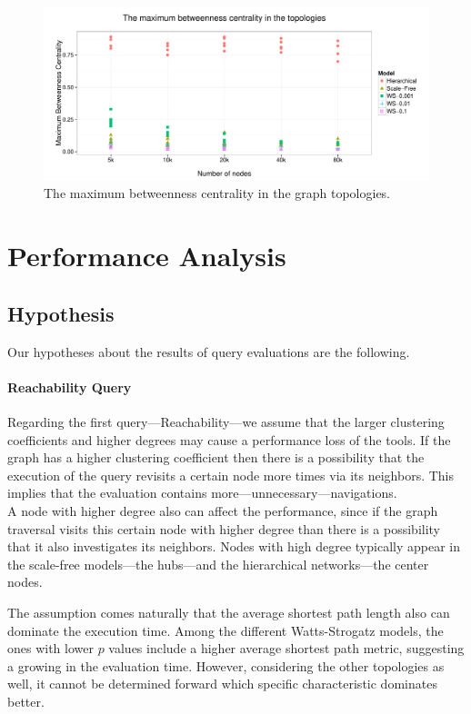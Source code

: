 \begin{figure}[!ht]
	\centering
	\includegraphics[width=160mm, keepaspectratio]{figures/betweenness_metric.pdf}
	\caption{The maximum betweenness centrality in the graph topologies.}
	\label{fig:betweenness_metric}
\end{figure}

\section{Performance Analysis}

\subsection{Hypothesis}

Our hypotheses about the results of query evaluations are the following.

\paragraph{Reachability Query}
Regarding the first query---Reachability---we assume that the larger clustering coefficients and higher degrees may cause a performance loss of the tools. If the graph has a higher clustering coefficient then there is a possibility that the execution of the query revisits a certain node more times via its neighbors. This implies that the evaluation contains more---unnecessary---navigations.\\
A node with higher degree also can affect the performance, since if the graph traversal visits this certain node with higher degree than there is a possibility that it also investigates its neighbors. Nodes with high degree typically appear in the scale-free models---the hubs---and the hierarchical networks---the center nodes.

The assumption comes naturally that the average shortest path length also can dominate the execution time. Among the different Watts-Strogatz models, the ones with lower $p$ values include a higher average shortest path metric, suggesting a growing in the evaluation time. However, considering the other topologies as well, it cannot be determined forward which specific characteristic dominates better.

